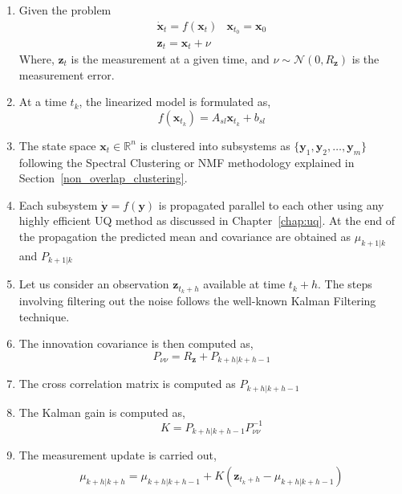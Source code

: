 \begin{enumerate}
\item Given the problem 
\begin{equation}
\label{meas_eqn}
\begin{array}{lr}
\dot{\textbf{x}}_t = f(\textbf{x}_t) & \textbf{x}_{t_0} = \textbf{x}_0 \\
\textbf{z}_t = \textbf{x}_t + \nu
\end{array}
\end{equation}
Where, $\textbf{z}_t$ is the measurement at a given time, and $\nu \sim \mathcal{N}(0,R_{\textbf{z}})$ is the measurement error.
\item At a time $t_k$, the linearized model is formulated as, 
\begin{equation}
f(\textbf{x}_{t_k}) = A_{sl}\textbf{x}_{t_k} + b_{sl}
\end{equation}
\item The state space $\textbf{x}_t \in \mathbb{R}^n$ is clustered into subsystems as $\lbrace \mathbf{y}_1, \mathbf{y}_2 , \ldots , \mathbf{y}_m \rbrace$ following the Spectral Clustering or NMF methodology explained in Section~\ref{non_overlap_clustering}.
\item Each subsystem $\dot{\textbf{y}} = f(\textbf{y})$  is propagated parallel to each other using any highly efficient UQ method as discussed in Chapter~\ref{chap:uq}. At the end of the propagation the predicted mean and covariance are obtained as $\mu_{k+1|k}$ and $P_{k+1|k}$
\item Let us consider an observation $\textbf{z}_{t_k + h}$ available at time $t_k + h$. The steps involving filtering out the noise follows the well-known Kalman Filtering technique.
\item The innovation covariance is then computed as,
\begin{equation}
P_{\nu \nu} = R_{\textbf{z}} + P_{k+h|k+h-1}
\end{equation}
\item The cross correlation matrix is computed as $P_{k+h|k+h-1}$
\item The Kalman gain is computed as, 
\begin{equation}
K = P_{k+h|k+h-1} P_{\nu \nu}^{-1}
\end{equation}
\item The measurement update is carried out,
\begin{equation}
\begin{array}{l}
\mu_{k+h|k+h} = \mu_{k+h|k+h-1} + K(\textbf{z}_{t_k + h} - \mu_{k+h|k+h-1})  \\

\end{array}
\end{equation}
\end{enumerate}
